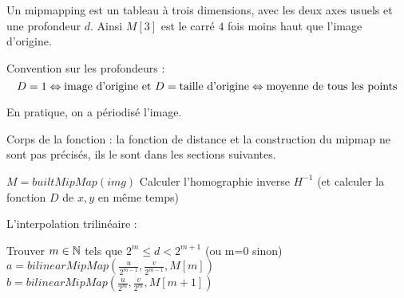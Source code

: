 

Un mipmapping est un tableau à trois dimensions, avec les deux axes usuels et une profondeur $d$.
Ainsi $M[3]$ est le carré $4$ fois moins haut que l'image d'origine. 

Convention sur les profondeurs : $$D = 1 \Leftrightarrow \textrm{image d'origine et} \ D = \textrm{taille d'origine} \Leftrightarrow \textrm{moyenne de tous les points}$$


En pratique, on a périodisé l'image.


Corps de la fonction : la fonction de distance et la construction du mipmap ne sont pas précisés, ils le sont dans les sections suivantes.
\medbreak
\medbreak
\begin{algorithm}[H]
\caption{$mainFunction(img,H,I)$}
$M=builtMipMap(img)$ \;%
Calculer l'homographie inverse $H^{-1}$ (et calculer la fonction $D$ de $x,y$ en même temps)\;
\end{algorithm}

\medbreak
\medbreak
L'interpolation trilinéaire :
\medbreak
\medbreak

\begin{algorithm}[H]
\caption{$evalPixel(u,v,d,M)$}
Trouver $m \in \mathbb{N}$ tels que $2^m \leq d < 2^{m+1}$ (ou m=0 sinon)\;
$a=bilinearMipMap(\frac{u}{2^{m-1}}, \frac{v}{2^{m-1}},M[m])$\;
$b= bilinearMipMap(\frac{u}{2^{m}}, \frac{v}{2^{m}},M[m+1])$\; 
\end{algorithm}

